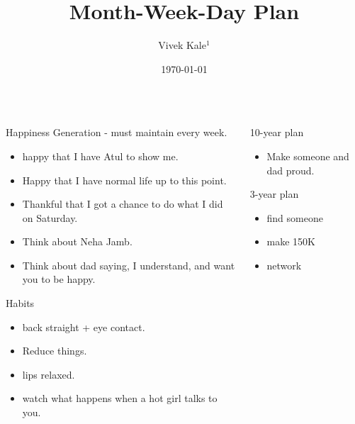 \documentclass[serif, mathserif, final]{beamer}
\title{Month-Week-Day Plan}
\author{Vivek Kale$^1$}
\institute{$^1$ University of Illinois at Urbana-Champaign}
\date{\today}
\begin{document}
  

\begin{frame}{} 
  \begin{columns}
    \begin{column}{0.22\linewidth}
      \begin{block}{Happiness Generation - must maintain every week.} 
        \begin{itemize}
          \tiny \item \tiny happy that I have Atul to show me.  
        \item \tiny Happy that I have normal life up to this point.  
        \item \tiny Thankful that I got a chance to do what I did on Saturday. 
        \item \tiny Think about Neha Jamb. 
        \item \tiny Think about dad saying, I understand, and want you to be happy. 
        \end{itemize}
      \end{block}

    \begin{block}{Habits} 
      \begin{itemize} 
        \tiny \item \tiny back straight + eye contact. 
      \item \tiny Reduce things. 
      \item \tiny lips relaxed. 
      \item \tiny watch what happens when a hot girl talks to you. 
      \end{itemize} 
    \end{block} 
  \end{column} %

  \begin{column}{0.5\linewidth}
    \begin{block}{ 10-year plan }
      \begin{itemize}
      \item \small Make someone and dad proud.
      \end{itemize}
    \end{block}
    
    \begin{block}{ 3-year plan }
      \begin{itemize}
      \item \small find someone
      \item \small make 150K
      \item \small network
      \end{itemize}
    \end{block}


\end{column}
\end{columns}
\end{frame}
\end{document}
